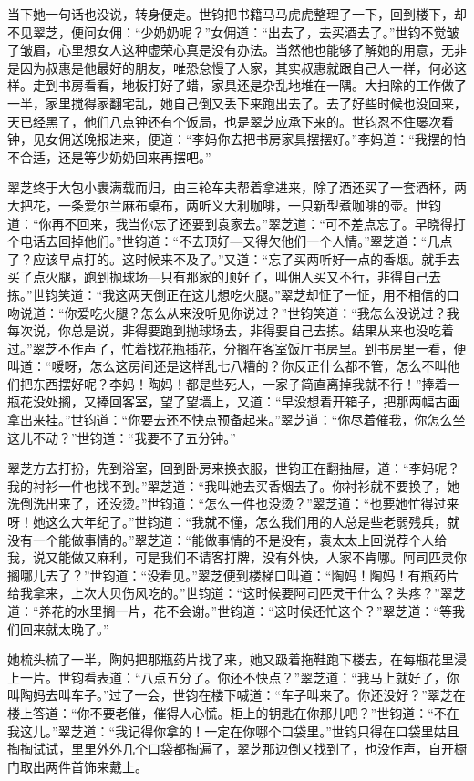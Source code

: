 \par 当下她一句话也没说，转身便走。世钧把书籍马马虎虎整理了一下，回到楼下，却不见翠芝，便问女佣：“少奶奶呢？”女佣道：“出去了，去买酒去了。”世钧不觉皱了皱眉，心里想女人这种虚荣心真是没有办法。当然他也能够了解她的用意，无非是因为叔惠是他最好的朋友，唯恐怠慢了人家，其实叔惠就跟自己人一样，何必这样。走到书房看看，地板打好了蜡，家具还是杂乱地堆在一隅。大扫除的工作做了一半，家里搅得家翻宅乱，她自己倒又丢下来跑出去了。去了好些时候也没回来，天已经黑了，他们八点钟还有个饭局，也是翠芝应承下来的。世钧忍不住屡次看钟，见女佣送晚报进来，便道：“李妈你去把书房家具摆摆好。”李妈道：“我摆的怕不合适，还是等少奶奶回来再摆吧。”
\par 翠芝终于大包小裹满载而归，由三轮车夫帮着拿进来，除了酒还买了一套酒杯，两大把花，一条爱尔兰麻布桌布，两听义大利咖啡，一只新型煮咖啡的壶。世钧道：“你再不回来，我当你忘了还要到袁家去。”翠芝道：“可不差点忘了。早晓得打个电话去回掉他们。”世钧道：“不去顶好—又得欠他们一个人情。”翠芝道：“几点了？应该早点打的。这时候来不及了。”又道：“忘了买两听好一点的香烟。就手去买了点火腿，跑到抛球场—只有那家的顶好了，叫佣人买又不行，非得自己去拣。”世钧笑道：“我这两天倒正在这儿想吃火腿。”翠芝却怔了一怔，用不相信的口吻说道：“你爱吃火腿？怎么从来没听见你说过？”世钧笑道：“我怎么没说过？我每次说，你总是说，非得要跑到抛球场去，非得要自己去拣。结果从来也没吃着过。”翠芝不作声了，忙着找花瓶插花，分搁在客室饭厅书房里。到书房里一看，便叫道：“嗳呀，怎么这房间还是这样乱七八糟的？你反正什么都不管，怎么不叫他们把东西摆好呢？李妈！陶妈！都是些死人，一家子简直离掉我就不行！”捧着一瓶花没处搁，又捧回客室，望了望墙上，又道：“早没想着开箱子，把那两幅古画拿出来挂。”世钧道：“你要去还不快点预备起来。”翠芝道：“你尽着催我，你怎么坐这儿不动？”世钧道：“我要不了五分钟。”
\par 翠芝方去打扮，先到浴室，回到卧房来换衣服，世钧正在翻抽屉，道：“李妈呢？我的衬衫一件也找不到。”翠芝道：“我叫她去买香烟去了。你衬衫就不要换了，她洗倒洗出来了，还没烫。”世钧道：“怎么一件也没烫？”翠芝道：“也要她忙得过来呀！她这么大年纪了。”世钧道：“我就不懂，怎么我们用的人总是些老弱残兵，就没有一个能做事情的。”翠芝道：“能做事情的不是没有，袁太太上回说荐个人给我，说又能做又麻利，可是我们不请客打牌，没有外快，人家不肯哪。阿司匹灵你搁哪儿去了？”世钧道：“没看见。”翠芝便到楼梯口叫道：“陶妈！陶妈！有瓶药片给我拿来，上次大贝伤风吃的。”世钧道：“这时候要阿司匹灵干什么？头疼？”翠芝道：“养花的水里搁一片，花不会谢。”世钧道：“这时候还忙这个？”翠芝道：“等我们回来就太晚了。”
\par 她梳头梳了一半，陶妈把那瓶药片找了来，她又趿着拖鞋跑下楼去，在每瓶花里浸上一片。世钧看表道：“八点五分了。你还不快点？”翠芝道：“我马上就好了，你叫陶妈去叫车子。”过了一会，世钧在楼下喊道：“车子叫来了。你还没好？”翠芝在楼上答道：“你不要老催，催得人心慌。柜上的钥匙在你那儿吧？”世钧道：“不在我这儿。”翠芝道：“我记得你拿的！一定在你哪个口袋里。”世钧只得在口袋里姑且掏掏试试，里里外外几个口袋都掏遍了，翠芝那边倒又找到了，也没作声，自开橱门取出两件首饰来戴上。

